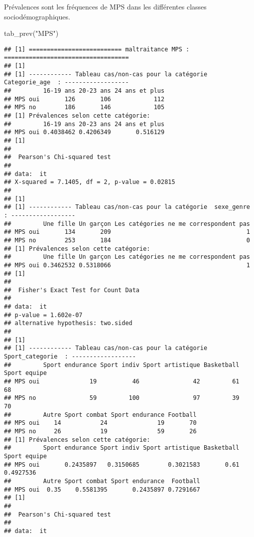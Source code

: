 \documentclass[
]{article}
\newenvironment{Shaded}{\begin{snugshade}}{\end{snugshade}}
\newcommand{\FunctionTok}[1]{\textcolor[rgb]{0.00,0.00,0.00}{#1}}
\newcommand{\NormalTok}[1]{#1}
\newcommand{\StringTok}[1]{\textcolor[rgb]{0.31,0.60,0.02}{#1}}
\begin{document}
Prévalences sont les fréquences de MPS dans les différentes classes
sociodémographiques.

\begin{Shaded}
\begin{Highlighting}[]
\FunctionTok{tab\_prev}\NormalTok{(}\StringTok{"MPS"}\NormalTok{)}
\end{Highlighting}
\end{Shaded}

\begin{verbatim}
## [1] ========================== maltraitance MPS : ===================================
## [1] 
## [1] ------------ Tableau cas/non-cas pour la catégorie  Categorie_age  : ------------------
##         16-19 ans 20-23 ans 24 ans et plus
## MPS oui       126       106            112
## MPS no        186       146            105
## [1] Prévalences selon cette catégorie:
##         16-19 ans 20-23 ans 24 ans et plus
## MPS oui 0.4038462 0.4206349       0.516129
## [1] 
## 
##  Pearson's Chi-squared test
## 
## data:  it
## X-squared = 7.1405, df = 2, p-value = 0.02815
## 
## [1] 
## [1] ------------ Tableau cas/non-cas pour la catégorie  sexe_genre  : ------------------
##         Une fille Un garçon Les catégories ne me correspondent pas
## MPS oui       134       209                                      1
## MPS no        253       184                                      0
## [1] Prévalences selon cette catégorie:
##         Une fille Un garçon Les catégories ne me correspondent pas
## MPS oui 0.3462532 0.5318066                                      1
## [1] 
## 
##  Fisher's Exact Test for Count Data
## 
## data:  it
## p-value = 1.602e-07
## alternative hypothesis: two.sided
## 
## [1] 
## [1] ------------ Tableau cas/non-cas pour la catégorie  Sport_categorie  : ------------------
##         Sport endurance Sport indiv Sport artistique Basketball Sport equipe
## MPS oui              19          46               42         61           68
## MPS no               59         100               97         39           70
##         Autre Sport combat Sport endurance Football
## MPS oui    14           24              19       70
## MPS no     26           19              59       26
## [1] Prévalences selon cette catégorie:
##         Sport endurance Sport indiv Sport artistique Basketball Sport equipe
## MPS oui       0.2435897   0.3150685        0.3021583       0.61    0.4927536
##         Autre Sport combat Sport endurance  Football
## MPS oui  0.35    0.5581395       0.2435897 0.7291667
## [1] 
## 
##  Pearson's Chi-squared test
## 
## data:  it

\end{verbatim}
\end{document}
